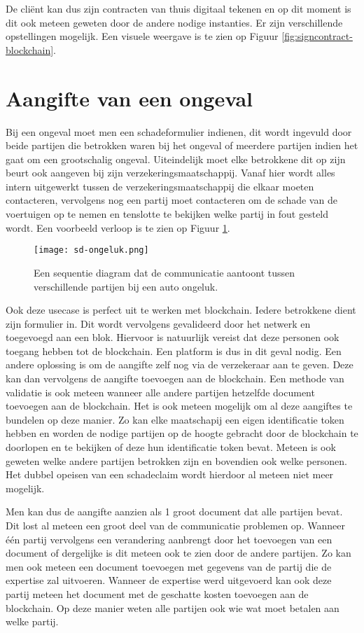 De cliënt kan dus zijn contracten van thuis digitaal tekenen en op dit moment is dit ook meteen geweten door de andere nodige instanties. Er zijn verschillende opstellingen mogelijk. Een visuele weergave is te zien op Figuur \ref{fig:signcontract-blockchain}.

\section{Aangifte van een ongeval}
Bij een ongeval moet men een schadeformulier indienen, dit wordt ingevuld door beide partijen die betrokken waren bij het ongeval of meerdere partijen indien het gaat om een grootschalig ongeval. Uiteindelijk moet elke betrokkene dit op zijn beurt ook aangeven bij zijn verzekeringsmaatschappij. Vanaf hier wordt alles intern uitgewerkt tussen de verzekeringsmaatschappij die elkaar moeten contacteren, vervolgens nog een partij moet contacteren om de schade van de voertuigen op te nemen en tenslotte te bekijken welke partij in fout gesteld wordt. Een voorbeeld verloop is te zien op Figuur \ref{fig:accident}.

\begin{figure}
	\texttt{[image: sd-ongeluk.png]}
	\caption{Een sequentie diagram dat de communicatie aantoont tussen verschillende partijen bij een auto ongeluk.}
	\label{fig:accident}
\end{figure}

Ook deze usecase is perfect uit te werken met blockchain. Iedere betrokkene dient zijn formulier in. Dit wordt vervolgens gevalideerd door het netwerk en toegevoegd aan een blok. Hiervoor is natuurlijk vereist dat deze personen ook toegang hebben tot de blockchain. Een platform is dus in dit geval nodig. Een andere oplossing is om de aangifte zelf nog via de verzekeraar aan te geven. Deze kan dan vervolgens de aangifte toevoegen aan de blockchain. Een methode van validatie is ook meteen wanneer alle andere partijen hetzelfde document toevoegen aan de blockchain. Het is ook meteen mogelijk om al deze aangiftes te bundelen op deze manier. Zo kan elke maatschapij een eigen identificatie token hebben en worden de nodige partijen op de hoogte gebracht door de blockchain te doorlopen en te bekijken of deze hun identificatie token bevat. Meteen is ook geweten welke andere partijen betrokken zijn en bovendien ook welke personen. Het dubbel opeisen van een schadeclaim wordt hierdoor al meteen niet meer mogelijk. 

Men kan dus de aangifte aanzien als 1 groot document dat alle partijen bevat. Dit lost al meteen een groot deel van de communicatie problemen op. Wanneer één partij vervolgens een verandering aanbrengt door het toevoegen van een document of dergelijke is dit meteen ook te zien door de andere partijen. Zo kan men ook meteen een document toevoegen met gegevens van de partij die de expertise zal uitvoeren. Wanneer de expertise werd uitgevoerd kan ook deze partij  meteen het document met de geschatte kosten toevoegen aan de blockchain. Op deze manier weten alle partijen ook wie wat moet betalen aan welke partij.


